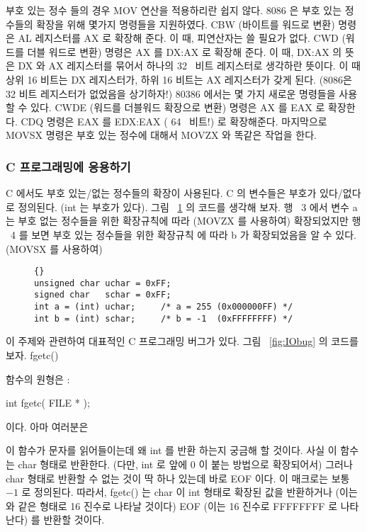 부호 있는 정수 들의 경우 {\code MOV} 연산을 적용하리란 쉽지 않다. 8086 은 
부호 있는 정수들의 확장을 위해 몇가지 명령들을 지원하였다. {\code CBW} 
 (바이트를 워드로 변환) 명령은 AL 레지스터를 AX 로 확장해 준다. 
이 때, 피연산자는 쓸 필요가 없다. {\code CWD}  (워드를 더블 
워드로 변환) 명령은 AX 를 DX:AX 로 확장해 준다. 이 때, DX:AX 의 뜻은 
DX 와 AX 레지스터를 묶어서 하나의 32~ 비트 레지스터로 생각하란 뜻이다. 
이 때 상위 16 비트는 DX 레지스터가, 하위 16 비트는 AX 레지스터가 갖게 된다.
(8086은 32 비트 레지스터가 없었음을 상기하자!) 80386 에서는 몇 가지 새로운 명령들을
사용할 수 있다. {\code CWDE}  (워드를 더블워드 확장으로
변환) 명령은 AX 를 EAX 로 확장한다. {\code CDQ} 명령은 EAX 를 EDX:EAX (
64~ 비트!)  로 확장해준다. 마지막으로
{\code MOVSX}  명령은 부호 있는 정수에 대해서 
{\code MOVZX} 와 똑같은 작업을 한다. 

\subsubsection{C 프로그래밍에 응용하기}

C 에서도 부호 있는/없는 정수들의 확장이 사용된다.  C 의 변수들은 부호가 있다/없다 로 정의된다. ({\code int} 는 
부호가 있다). 그림 ~\ref{fig:charExt} 의 코드를 생각해 보자. 행 ~3 에서 변수
{\code a} 는 부호 없는 정수들을 위한 확장규칙에 따라 ({\code MOVZX} 
를 사용하여) 확장되었지만 행 ~4 를 보면 부호 있는 정수들을 위한 확장규칙
에 따라 {\code b} 가 확장되었음을 알 수 있다. ({\code MOVSX} 를 사용하여)

\begin{figure}[t]
\begin{lstlisting}[frame=tlrb]{}
unsigned char uchar = 0xFF;
signed char   schar = 0xFF;
int a = (int) uchar;     /* a = 255 (0x000000FF) */
int b = (int) schar;     /* b = -1  (0xFFFFFFFF) */
\end{lstlisting}
\caption{}
\label{fig:charExt}
\end{figure}

이 주제와 관련하여 대표적인 C 프로그래밍 버그가 있다. 그림 ~\ref{fig:IObug}
의 코드를 보자. {\code fgetc()}{\samepage 함수의 원형은 :
\begin{CodeQuote}
int fgetc( FILE * );
\end{CodeQuote}
이다. 아마 여러분은 } 이 함수가 문자를 읽어들이는데 왜 {\code int} 를 반환
하는지 궁금해 할 것이다. 사실 이 함수는  {\code char} 형태로 반환한다. 
(다만, {\code int} 로 앞에 0 이 붙는 방법으로 확장되어서) 그러나 {\code char} 형태로
반환할 수 없는 것이 딱 하나 있는데 바로 {\code EOF} 이다. 이 매크로는 
보통 $-1$ 로 정의된다. 따라서, {\code fgetc()} 는 {\code char} 이 
{\code int} 형태로 확장된 값을 반환하거나 (이는 {} 와
같은 형태로 16 진수로 나타날 것이다) {\code EOF} (이는 16 진수로 
{\code FFFFFFFF} 로 나타난다) 를 반환할 것이다. 

